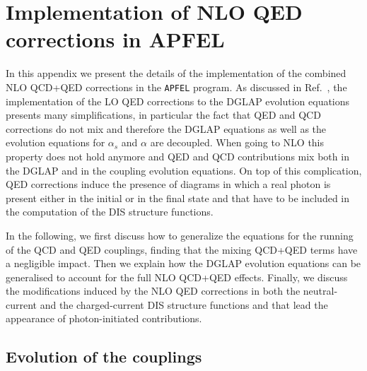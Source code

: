 \appendix
\section{Implementation of NLO QED corrections in APFEL}
\label{sec:appendixAPFEL}

In this appendix we present the details of the implementation of the
combined NLO QCD+QED corrections in the {\tt APFEL} program.
%
As discussed in Ref.~\cite{Bertone:2013vaa}, the implementation of the
LO QED corrections to the DGLAP evolution equations presents many
simplifications, in particular the fact that QED and QCD corrections
do not mix and therefore the DGLAP equations as well as the evolution
equations for $\alpha_s$ and $\alpha$ are decoupled.
%
When going to NLO this property does not hold anymore and QED and QCD
contributions mix both in the DGLAP and in the coupling evolution
equations.
%
On top of this complication, QED corrections induce the presence of
diagrams in which a real photon is present either in the initial or in
the final state and that have to be included in the computation of the
DIS structure functions.

In the following, we first discuss how to generalize the equations for
the running of the QCD and QED couplings, finding that the mixing
QCD+QED terms have a negligible impact.
%
Then we explain how the DGLAP evolution equations can be generalised
to account for the full NLO QCD+QED effects.
%
Finally, we discuss the modifications induced by the NLO QED
corrections in both the neutral-current and the charged-current DIS
structure functions and that lead the appearance of photon-initiated
contributions.

\subsection{Evolution of the couplings}

